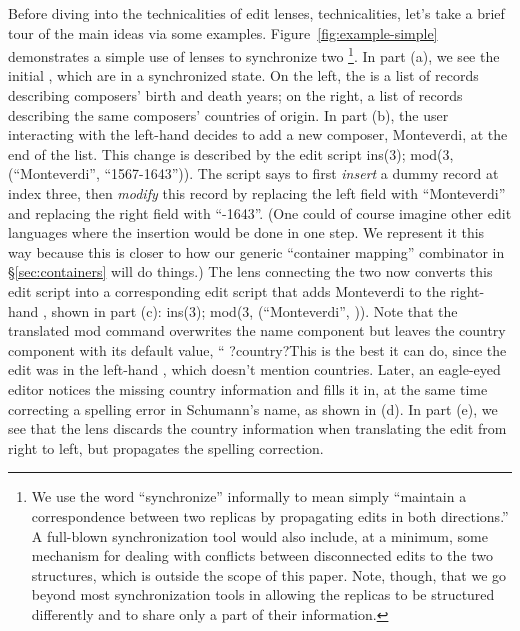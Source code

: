 Before diving into \ifdissertation the technicalities of edit lenses, \else
technicalities, \fi let's take a brief tour of the main ideas via some
examples.
%
Figure~\ref{fig:example-simple} demonstrates a simple use of {\edit} lenses
to synchronize two \replicas\ifdelta\footnote{We use the word ``synchronize''
  informally to mean simply ``maintain a correspondence between two replicas
  by propagating edits in both directions.''  A full-blown synchronization
  tool would also include, at a minimum, some mechanism for dealing with
  conflicts between disconnected edits to the two structures, which is
  outside the scope of this paper.  \iffull Note, though, that we go beyond most
  synchronization tools in allowing the replicas to be structured
  differently and to share only a part of their information.\fi}\fi.  In part (a),
we see the initial \replicas, which are in a synchronized state.  On the
left, the \replica is a list of records describing composers' birth and death
years; on the right,  a list of records describing the same
composers' countries of origin.  In part (b), the user interacting with the
left-hand \replica decides to add a new composer, {\sf Monteverdi}, at the
end of the list. This change is described by the edit script {\sf ins(3);
mod(3, (``Monteverdi'', ``1567-1643''))}. The script says to first
\emph{insert} a dummy record at index three, then \emph{modify} this record by
replacing the left field with ``{\sf Monteverdi}'' and replacing the 
right field with ``{-1643}''.  (One could of course imagine other edit
languages where the insertion would be done in one step.  We represent it
this way because this is closer to how our generic ``container mapping''
combinator in \S \ref{sec:containers} will do things.) The lens connecting
the two \replicas now converts this edit script into a corresponding edit
script that adds {\sf Monteverdi} to the right-hand \replica, shown in part
(c): {\sf ins(3); mod(3, (``Monteverdi'', \ONE))}.
Note that the translated {\sf mod} command overwrites the name component but
leaves the country component with its default value, ``{\sf
  ?country?}\dotquote This is the best it can do, since the edit was in
the left-hand \replica, which doesn't mention countries.  
%
Later, an eagle-eyed editor notices the missing country information and
fills it in, at the same time correcting a spelling error in {\sf
  Schumann}'s name, as shown in (d). In part (e), we see that the lens
discards the country information when
translating the edit from right to left, but propagates the spelling
correction. 

